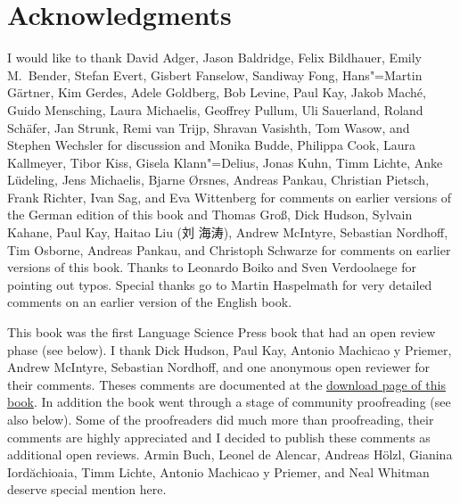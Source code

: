 \section*{Acknowledgments}

\addlines
I would like to thank David Adger,
Jason Baldridge, 
Felix Bildhauer, 
Emily M.\ Bender,
Stefan Evert, 
Gisbert Fanselow, 
Sandiway Fong,
Hans"=Martin Gärtner,
Kim Gerdes,
Adele Goldberg,
Bob Levine,
Paul Kay,
Jakob Maché,
Guido Mensching,
Laura Michaelis,
Geoffrey Pullum, 
Uli Sauerland, 
Roland Schäfer,
Jan Strunk,
Remi van Trijp, 
Shravan Vasishth,
Tom Wasow, and
Stephen Wechsler
for discussion and 
%
Monika Budde, 
Philippa Cook,
Laura Kallmeyer, 
Tibor Kiss,
Gisela Klann"=Delius, 
Jonas Kuhn,
Timm Lichte, %
Anke Lüdeling,
Jens Michaelis,
Bjarne Ørsnes,
Andreas Pankau,     %
Christian Pietsch,
Frank Richter,
Ivan Sag, and
Eva Wittenberg
for comments on earlier versions of the German edition of this book and
%
%
Thomas Groß,
Dick Hudson,
Sylvain Kahane, 
Paul Kay,
Haitao Liu ({\lsSeriesHistoryFandolSong 刘 海涛}),
Andrew McIntyre,
Sebastian Nordhoff,
Tim Osborne, 
Andreas Pankau, and
Christoph Schwarze
for comments on earlier versions of this book. Thanks to Leonardo Boiko and Sven Verdoolaege for pointing out typos.
Special thanks go to Martin Haspelmath for very detailed comments on an
earlier version of the English book. 

This book was the first Language Science Press book that had an open review phase (see below). I
thank Dick Hudson, Paul Kay, Antonio Machicao y Priemer, Andrew McIntyre, Sebastian Nordhoff, and one anonymous open
reviewer for their comments. Theses comments are documented at the \href{\lsURL}{download page of
  this book}. In addition the book went through a stage of community proofreading (see also
below). Some of the proofreaders did much more than proofreading, their comments are highly
appreciated and I decided to publish these comments as additional open reviews.
Armin Buch, 
Leonel de Alencar,
Andreas Hölzl,
Gianina Iordăchioaia,
Timm Lichte,
Antonio Machicao y Priemer, and
Neal Whitman
deserve special mention here.


